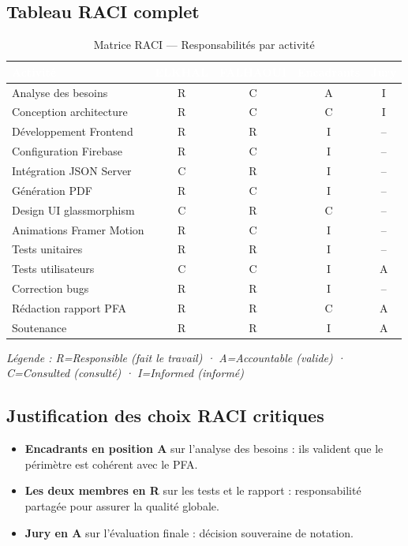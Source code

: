 \documentclass[12pt,a4paper]{report}
\begin{document}
\subsection{Tableau RACI complet}

\begin{table}[H]
\centering
\caption{Matrice RACI — Responsabilités par activité}
\label{tab:raci}
\begin{tabularx}{\textwidth}{|X|c|c|c|c|}
\hline
\rowcolor{emsiblue}\textcolor{white}{\textbf{Activité}} & \textcolor{white}{\textbf{ELKHAL}} & \textcolor{white}{\textbf{FALHAOUI}} & \textcolor{white}{\textbf{Encadrants}} & \textcolor{white}{\textbf{Jury}} \\
\hline
Analyse des besoins & R & C & A & I \\
Conception architecture & R & C & C & I \\
Développement Frontend & R & R & I & -- \\
Configuration Firebase & R & C & I & -- \\
Intégration JSON Server & C & R & I & -- \\
Génération PDF & R & C & I & -- \\
Design UI glassmorphism & C & R & C & -- \\
Animations Framer Motion & R & C & I & -- \\
Tests unitaires & R & R & I & -- \\
Tests utilisateurs & C & C & I & A \\
Correction bugs & R & R & I & -- \\
Rédaction rapport PFA & R & R & C & A \\
Soutenance & R & R & I & A \\
\hline
\end{tabularx}
\end{table}

\textit{Légende : R=Responsible (fait le travail) · A=Accountable (valide) · C=Consulted (consulté) · I=Informed (informé)}

\subsection{Justification des choix RACI critiques}

\begin{itemize}
    \item \textbf{Encadrants en position A} sur l'analyse des besoins : ils valident que le périmètre est cohérent avec le PFA.
    \item \textbf{Les deux membres en R} sur les tests et le rapport : responsabilité partagée pour assurer la qualité globale.
    \item \textbf{Jury en A} sur l'évaluation finale : décision souveraine de notation.
\end{itemize}
\end{document}
